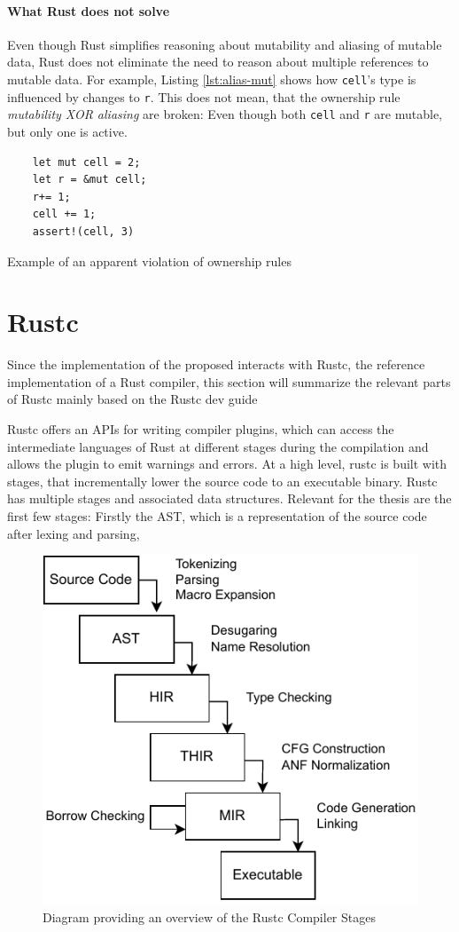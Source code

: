 \documentclass{book}
\newcommand{\code}[1]{\texttt{#1}}
\theoremstyle{definition}
\begin{document}
\paragraph*{What Rust does not solve} Even though Rust simplifies reasoning about mutability and aliasing of mutable data, Rust does not eliminate the need to reason about multiple references to mutable data. For example, Listing \ref{lst:alias-mut} shows how \code{cell}'s type is influenced by changes to \code{r}. This does not mean, that the ownership rule  \textit{mutability XOR aliasing} are broken: Even though both \code{cell} and \code{r} are mutable, but only one is active.

\begin{listing}[h]
  \begin{verbatim}
    let mut cell = 2;
    let r = &mut cell;
    r+= 1;
    cell += 1;
    assert!(cell, 3)
  \end{verbatim}
  \caption{Example of an apparent violation of ownership rules}
  \label{lst:alias-mut}
\end{listing}

\section{Rustc}

Since the implementation of the proposed interacts with Rustc, the reference implementation of a Rust compiler, this section will summarize the relevant parts of Rustc mainly based on the Rustc dev guide \cite{noauthor_overview_nodate}

Rustc offers an APIs for writing compiler plugins, which can access the intermediate languages of Rust at different stages during the compilation and allows the plugin to emit warnings and errors. 
At a high level, rustc is built with stages, that incrementally lower the source code to an executable binary. Rustc has multiple stages and associated data structures. 
Relevant for the thesis are the first few stages: Firstly the AST, which is a representation of the source code after lexing and parsing, 

\begin{figure}[h]
	\centering
	\includegraphics[width=0.7\linewidth]{./rustc-stages.pdf}
	\caption{Diagram providing an overview of the Rustc Compiler Stages}
	\label{fig:rust-stages}
\end{figure}
\end{document}
